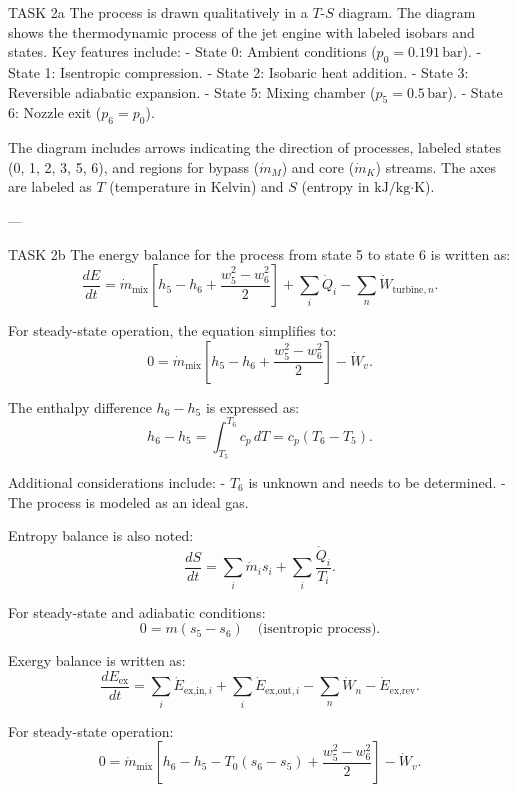 TASK 2a  
The process is drawn qualitatively in a \( T \)-\( S \) diagram. The diagram shows the thermodynamic process of the jet engine with labeled isobars and states. Key features include:  
- State 0: Ambient conditions (\( p_0 = 0.191 \, \text{bar} \)).  
- State 1: Isentropic compression.  
- State 2: Isobaric heat addition.  
- State 3: Reversible adiabatic expansion.  
- State 5: Mixing chamber (\( p_5 = 0.5 \, \text{bar} \)).  
- State 6: Nozzle exit (\( p_6 = p_0 \)).  

The diagram includes arrows indicating the direction of processes, labeled states (0, 1, 2, 3, 5, 6), and regions for bypass (\( \dot{m}_M \)) and core (\( \dot{m}_K \)) streams. The axes are labeled as \( T \) (temperature in Kelvin) and \( S \) (entropy in \( \text{kJ}/\text{kg·K} \)).  

---

TASK 2b  
The energy balance for the process from state 5 to state 6 is written as:  
\[
\frac{dE}{dt} = \dot{m}_{\text{mix}} \left[ h_5 - h_6 + \frac{w_5^2 - w_6^2}{2} \right] + \sum_i \dot{Q}_i - \sum_n \dot{W}_{\text{turbine},n}.
\]  

For steady-state operation, the equation simplifies to:  
\[
0 = \dot{m}_{\text{mix}} \left[ h_5 - h_6 + \frac{w_5^2 - w_6^2}{2} \right] - \dot{W}_v.
\]  

The enthalpy difference \( h_6 - h_5 \) is expressed as:  
\[
h_6 - h_5 = \int_{T_5}^{T_6} c_p \, dT = c_p (T_6 - T_5).
\]  

Additional considerations include:  
- \( T_6 \) is unknown and needs to be determined.  
- The process is modeled as an ideal gas.  

Entropy balance is also noted:  
\[
\frac{dS}{dt} = \sum_i \dot{m}_i s_i + \sum_i \frac{\dot{Q}_i}{T_i}.
\]  

For steady-state and adiabatic conditions:  
\[
0 = m (s_5 - s_6) \quad \text{(isentropic process)}.
\]  

Exergy balance is written as:  
\[
\frac{dE_{\text{ex}}}{dt} = \sum_i \dot{E}_{\text{ex,in},i} + \sum_i \dot{E}_{\text{ex,out},i} - \sum_n \dot{W}_{n} - \dot{E}_{\text{ex,rev}}.
\]  

For steady-state operation:  
\[
0 = \dot{m}_{\text{mix}} \left[ h_6 - h_5 - T_0 (s_6 - s_5) + \frac{w_5^2 - w_6^2}{2} \right] - \dot{W}_v.
\]  

